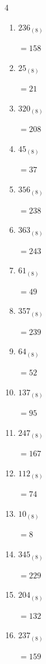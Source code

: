 \begin{multicols}{4}
\begin{enumerate}
        $=43$

  \item $236_{(8)}$

        $=158$

  \item $25_{(8)}$

        $=21$

  \item $320_{(8)}$

        $=208$

  \item $45_{(8)}$

        $=37$

  \item $356_{(8)}$

        $=238$

  \item $363_{(8)}$

        $=243$

  \item $61_{(8)}$

        $=49$

  \item $357_{(8)}$

        $=239$

  \item $64_{(8)}$

        $=52$

  \item $137_{(8)}$

        $=95$

\columnbreak %

  \item $247_{(8)}$

        $=167$

  \item $112_{(8)}$

        $=74$

  \item $10_{(8)}$

        $=8$

  \item $345_{(8)}$

        $=229$

  \item $204_{(8)}$

        $=132$

  \item $237_{(8)}$

        $=159$


\end{enumerate}
\end{multicols}

